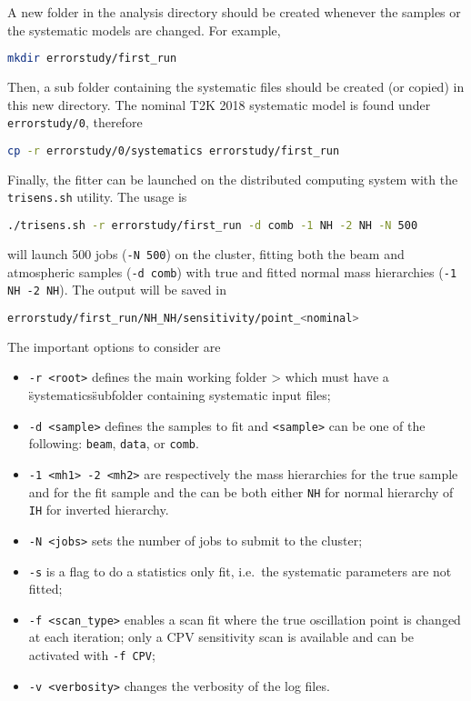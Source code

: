 \documentclass[a4paper, 11pt]{article}
\begin{document}
A new folder in the analysis directory should be created whenever the samples or the systematic models are changed.
For example,
\begin{lstlisting}[language=bash]
	mkdir errorstudy/first_run
\end{lstlisting}
Then, a sub folder containing the systematic files should be created (or copied) in this new directory.
The nominal T2K 2018 systematic model is found under \texttt{errorstudy/0}, therefore
\begin{lstlisting}[language=bash]
	cp -r errorstudy/0/systematics errorstudy/first_run
\end{lstlisting}

Finally, the fitter can be launched on the distributed computing system with %
the \texttt{trisens.sh} utility.
The usage is
\begin{lstlisting}[language=bash]
	./trisens.sh -r errorstudy/first_run -d comb -1 NH -2 NH -N 500
\end{lstlisting}
will launch 500 jobs (\texttt{-N 500}) on the cluster, fitting both the beam and atmospheric samples %
(\texttt{-d comb}) with true and fitted normal mass hierarchies (\texttt{-1 NH -2 NH}).
The output will be saved in
\begin{lstlisting}[language=bash]
	errorstudy/first_run/NH_NH/sensitivity/point_<nominal>
\end{lstlisting}
The important options to consider are
\begin{itemize}
		\small
	\item \texttt{-r <root>} defines the main working folder > which must have a \"systematics\"
		subfolder containing systematic input files;
	\item \texttt{-d <sample>} defines the samples to fit and \texttt{<sample>} can be one of
		the following: \texttt{beam}, \texttt{data}, or \texttt{comb}.
	\item \texttt{-1 <mh1> -2 <mh2>} are respectively the mass hierarchies for the %
		true sample and for the fit sample and the can be both either \texttt{NH} %
		for normal hierarchy of \texttt{IH} for inverted hierarchy.
	\item \texttt{-N <jobs>} sets the number of jobs to submit to the cluster;
	\item \texttt{-s} is a flag to do a statistics only fit, i.e.\ the systematic parameters are not fitted;
	\item \texttt{-f <scan\_type>} enables a scan fit where the true oscillation point is changed at each iteration; only a CPV sensitivity scan is available and can be activated with \texttt{-f CPV};
	\item \texttt{-v <verbosity>} changes the verbosity of the log files.
\end{itemize}
\end{document}
